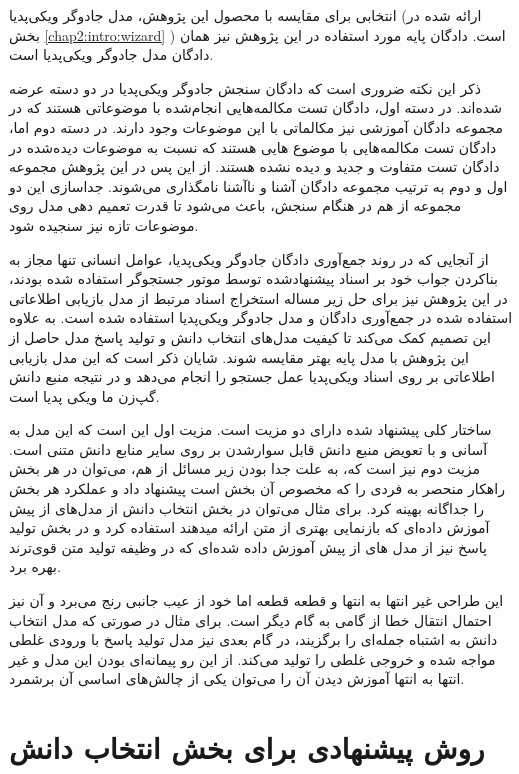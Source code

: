 انتخابی برای مقایسه با محصول این پژوهش، مدل جادوگر ویکی‌پدیا (ارائه شده در بخش 
\ref{chap2:intro:wizard}
)
است.
دادگان پایه مورد استفاده در این پژوهش نیز همان دادگان مدل جادوگر ویکی‌پدیا است.

ذکر این نکته ضروری است که دادگان سنجش جادوگر ویکی‌پدیا در دو دسته عرضه شده‌اند. در دسته اول، دادگان تست مکالمه‌هایی انجام‌شده با موضوعاتی هستند که در مجموعه دادگان آموزشی نیز مکالماتی با این موضوعات وجود دارند. در دسته دوم اما، دادگان تست مکالمه‌هایی با موضوع هایی هستند که نسبت به موضوعات دیده‌شده در دادگان تست متفاوت و جدید و دیده نشده هستند. از این پس در این پژوهش مجموعه اول و دوم به ترتیب مجموعه دادگان آشنا و ناآشنا نامگذاری می‌شوند. جداسازی این دو مجموعه از هم در هنگام سنجش، باعث می‌شود تا قدرت تعمیم دهی مدل روی موضوعات تازه نیز سنجیده شود. 


از آنجایی که در روند جمع‌آوری دادگان جادوگر ویکی‌پدیا،‌ عوامل انسانی تنها مجاز به بناکردن جواب خود بر اسناد پیشنهاد‌شده توسط موتور جستجوگر استفاده شده بودند، در این پژوهش نیز
برای حل زیر مساله استخراج اسناد مرتبط
از مدل بازیابی اطلاعاتی 
استفاده شده در جمع‌آوری دادگان و مدل جادوگر ویکی‌پدیا استفاده شده است. به علاوه این تصمیم کمک می‌کند تا کیفیت مدل‌های انتخاب دانش و تولید پاسخ مدل حاصل از این پژوهش با مدل پایه بهتر مقایسه شوند. شایان ذکر است که این مدل بازیابی اطلاعاتی بر روی اسناد ویکی‌پدیا عمل جستجو را انجام می‌دهد و در نتیجه منبع دانش گپ‌زن ما ویکی پدیا است.

ساختار کلی پیشنهاد شده دارای دو مزیت است. مزیت اول این است که این مدل
به آسانی و با تعویض منبع دانش قابل سوارشدن بر روی سایر منابع دانش متنی است. مزیت دوم نیز است که، به علت جدا بودن زیر مسائل از هم، می‌توان در هر بخش راهکار منحصر به فردی را که مخصوص آن بخش است پیشنهاد داد و عملکرد هر بخش را جداگانه بهینه کرد. برای مثال می‌توان در بخش انتخاب دانش از مدل‌های از پیش آموزش داده‌ای که بازنمایی بهتری از متن ارائه میدهند استفاده کرد و در بخش تولید پاسخ نیز از مدل های از پیش آموزش داده شده‌ای که در وظیفه تولید متن قوی‌ترند بهره برد.

این طراحی غیر انتها به انتها و قطعه قطعه اما خود از عیب جانبی رنج می‌برد و آن نیز احتمال انتقال خطا از گامی به گام دیگر است. برای مثال در صورتی که مدل انتخاب دانش به اشتباه جمله‌ای را برگزیند، در گام بعدی نیز مدل تولید پاسخ با ورودی غلطی مواجه شده و خروجی غلطی را تولید می‌کند. از این رو پیمانه‌ای بودن این مدل و غیر انتها به انتها آموزش دیدن آن را می‌توان یکی از چالش‌های اساسی آن برشمرد.
\section{روش پیشنهادی برای بخش انتخاب دانش}

